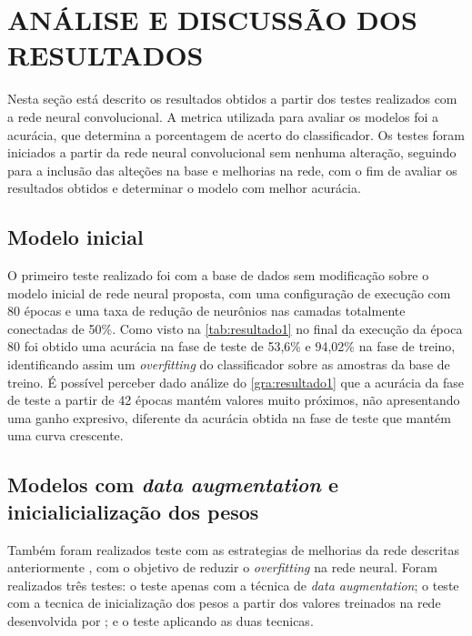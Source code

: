 
\chapter{ANÁLISE E DISCUSSÃO DOS RESULTADOS}


Nesta seção está descrito os resultados obtidos a partir dos testes realizados com a rede neural convolucional.
 A metrica utilizada para avaliar os modelos foi a acurácia, que determina a porcentagem de acerto do classificador.%
 Os testes foram iniciados a partir da rede neural convolucional sem nenhuma alteração, seguindo para a inclusão das alteções na base e melhorias na rede, com o fim de avaliar os resultados obtidos e determinar o modelo com melhor acurácia.

\section{Modelo inicial}
O primeiro teste realizado foi com a base de dados sem modificação sobre o modelo inicial de rede neural proposta, com uma configuração de execução com 80 épocas e uma taxa de redução de neurônios nas camadas totalmente conectadas de 50\%. Como visto na \autoref{tab:resultado1} no final da execução da época 80 foi obtido uma acurácia na fase de teste de 53,6\% e 94,02\% na fase de treino, identificando assim um \textit{overfitting} do classificador sobre as amostras da base de treino. É possível perceber dado análize do \autoref{gra:resultado1} que a acurácia da fase de teste a partir de 42 épocas mantém valores muito próximos, não apresentando uma ganho expresivo, diferente da acurácia obtida na fase de teste que mantém uma curva crescente.
\section{Modelos com \textit{data augmentation} e inicialicialização dos pesos}
Também foram realizados teste com as estrategias de melhorias da rede descritas anteriormente 
, com o objetivo de reduzir o \textit{overfitting} na rede neural. Foram realizados três testes: o teste apenas com a técnica de \textit{data augmentation}; o teste com a tecnica de inicialização dos pesos a partir dos valores treinados na rede desenvolvida por ; e o teste aplicando as duas tecnicas. 

